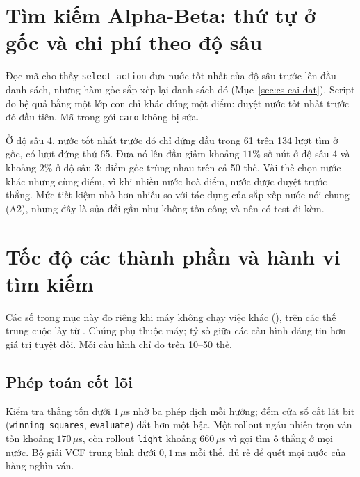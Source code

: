 \section{Tìm kiếm Alpha-Beta: thứ tự ở gốc và chi phí theo độ sâu}
\label{sec:cs-goc}
Đọc mã cho thấy \texttt{select\_action} đưa nước tốt nhất của độ sâu trước lên đầu danh sách, nhưng hàm gốc sắp xếp
lại danh sách đó (Mục~\ref{sec:cs-cai-dat}). Script  đo hệ quả bằng
một lớp con chỉ khác đúng một điểm: duyệt nước tốt nhất trước đó đầu tiên. Mã trong gói \texttt{caro} không bị sửa.

Ở độ sâu 4, nước tốt nhất trước đó chỉ đứng đầu trong 61 trên 134 lượt tìm ở gốc, có lượt đứng thứ 65. Đưa nó lên đầu
giảm khoảng $11\%$ số nút ở độ sâu 4 và khoảng $2\%$ ở độ sâu 3; điểm gốc trùng nhau trên cả 50 thế. Vài thế chọn nước
khác nhưng cùng điểm, vì khi nhiều nước hoà điểm, nước được duyệt trước thắng. Mức tiết kiệm nhỏ hơn nhiều so với tác
dụng của sắp xếp nước nói chung (A2), nhưng đây là sửa đổi gần như không tốn công và nên có test đi kèm.

\section{Tốc độ các thành phần và hành vi tìm kiếm}
\label{sec:cs-toc-do}
Các số trong mục này đo riêng khi máy không chạy việc khác (),
trên các thế trung cuộc lấy từ . Chúng phụ thuộc máy; tỷ số giữa các
cấu hình đáng tin hơn giá trị tuyệt đối. Mỗi cấu hình chỉ đo trên 10--50 thế.

\subsection{Phép toán cốt lõi}

Kiểm tra thắng tốn dưới $1\,\mu$s nhờ ba phép dịch mỗi hướng; đếm cửa sổ cắt lát bit (\texttt{winning\_squares},
\texttt{evaluate}) đắt hơn một bậc. Một rollout ngẫu nhiên trọn ván tốn khoảng $170\,\mu$s, còn rollout \texttt{light}
khoảng $660\,\mu$s vì gọi tìm ô thắng ở mọi nước. Bộ giải VCF trung bình dưới $0{,}1$\,ms mỗi thế, đủ rẻ để quét mọi
nước của hàng nghìn ván.

